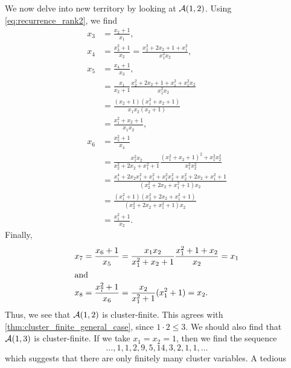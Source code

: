 \begin{example}
	We now delve into new territory by looking at $\mathcal{A}(1,2)$. Using
	\cref{eq:recurrence_rank2}, we find
	\begin{align*}
		x_3 & = \frac{x_2 + 1}{x_1},                                                                                     \\
		x_4 & = \frac{x_3^2 + 1}{x_2} =  \frac{x_2^2 + 2x_2 + 1 + x_1^2}{x_1^2 x_2},                                     \\
		x_5 & = \frac{x_4 + 1}{x_3},                                                                                     \\
		    & = \frac{x_1}{x_2+1}\frac{x_2^2 + 2x_2 +1 + x_1^2 + x_1^2 x_2}{x_1^2 x_2}                                   \\
		    & = \frac{(x_2 +1)(x_1^2 + x_2 + 1)}{x_1 x_2(x_2 + 1)}                                                       \\
		    & = \frac{x_1^2 + x_2 + 1}{x_1x_2},                                                                          \\
		x_6 & = \frac{x_5^2 +1}{x_4}                                                                                     \\
		    & = \frac{x_1^2 x_2}{x_2^2 + 2x_2 + x_1^2 + 1}\frac{(x_1^2 + x_2 + 1)^2 + x_1^2 x_2^2}{x_1^2x_2^2}           \\
		    & = \frac{x_1^4 + 2x_2x_1^2 + x_1^2 + x_1^2 x_2^2+ x_2^2 + 2 x_2 + x_1^2 + 1}{(x_2^2 + 2x_2 + x_1^2 + 1)x_2} \\
		    & = \frac{(x_1^2 + 1)(x_2^2 + 2x_2 + x_1^2 + 1)}{(x_2^2 + 2x_2 + x_1^2 + 1)x_2}                              \\
		    & = \frac{x_1^2 + 1}{x_2}.
	\end{align*}
	Finally,
	\begin{align*}
		x_7 & = \frac{x_6 +1}{x_5} = \frac{x_1x_2}{x_1^2 + x_2 + 1}\frac{x_1^2 +1 + x_2}{x_2} = x_1 \\
		\shortintertext{and}
		x_8 & = \frac{x_7^2 + 1}{x_6} = \frac{x_2}{x_1^2 + 1}(x_1^2 + 1) = x_2.
	\end{align*}
	Thus, we see that $\mathcal{A}(1,2)$ is cluster-finite. This agrees with
	\cref{thm:cluster_finite_general_case}, since $1 \cdot 2 \leq 3$. We should also find
	that $\mathcal{A}(1,3)$ is cluster-finite. If we take $x_1 = x_2 = 1$, then we find the
	sequence
	\begin{equation*}
		\dots, 1, 1, 2, 9, 5, 14, 3, 2, 1, 1, \dots
	\end{equation*}
	which suggests that there are only finitely many cluster variables. A tedious

\end{example}
